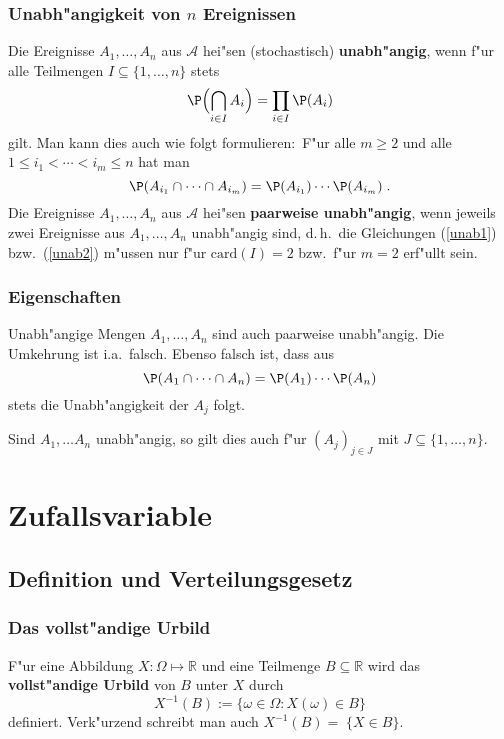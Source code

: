 \documentclass[ngerman,draft,parskip=half,twoside]{scrartcl}
\newcommand*{\R}{\mathbb{R}}      %
\newcommand*{\Algeb}{\mathcal{A}}   %
\begin{document}
\subsubsection{Unabh"angigkeit von $n$ Ereignissen}
Die Ereignisse $A_1,\ldots,A_n$ aus $\Algeb$ hei"sen (stochastisch) \textbf{unabh"angig},
wenn f"ur alle Teilmengen $I\subseteq\{1,\ldots,n\}$ stets
\begin{equation}
\label{unab1}
\P\Bigl(\bigcap_{i\in I} A_i\Bigr)= \prod_{i\in I}\P(A_i)
\end{equation}
gilt. Man kann dies auch wie folgt formulieren$\colon$ F"ur alle $m\ge 2$ und alle
$1\le i_1<\cdots<i_m\le n$ hat man
\begin{equation}
\label{unab2}
\P(A_{i_1}\cap\cdots\cap A_{i_m})= \P(A_{i_1})\cdots\P(A_{i_m})\;.
\end{equation}
Die Ereignisse $A_1,\ldots,A_n$ aus $\Algeb$ hei"sen \textbf{paarweise unabh"angig}, wenn
jeweils zwei Ereignisse aus $A_1,\ldots,A_n$ unabh"angig sind, d.\,h.~die Gleichungen
(\ref{unab1}) bzw.~(\ref{unab2}) m"ussen nur f"ur $\mathrm{card}(I)=2$ bzw.~f"ur $m=2$ erf"ullt sein.
\subsubsection{Eigenschaften}
Unabh"angige Mengen $A_1,\ldots,A_n$ sind auch paarweise unabh"angig. Die Umkehrung ist
i.a.~falsch. Ebenso falsch ist, dass aus
$$
\P(A_{1}\cap\cdots\cap A_{n})= \P(A_{1})\cdots\P(A_{n})
$$
stets die Unabh"angigkeit der $A_j$ folgt.

Sind $A_1,\ldots A_n$ unabh"angig, so gilt dies auch f"ur $(A_j)_{j\in J}$  mit
$J\subseteq \{1,\ldots,n\}$.

\section{Zufallsvariable}
\subsection{Definition und Verteilungsgesetz}

\subsubsection{Das vollst"andige Urbild}
F"ur eine Abbildung $X\colon\Omega\mapsto\R$ und eine Teilmenge $B\subseteq\R$ wird das
\textbf{vollst"andige Urbild} von $B$ unter $X$ durch
$$
X^{-1}(B):=\{\omega\in\Omega : X(\omega)\in B\}
$$
definiert. Verk"urzend schreibt man auch $X^{-1}(B)=\;\{X\in B\}$.
\end{document}
